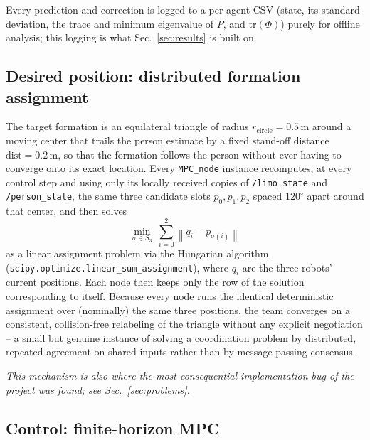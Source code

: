\documentclass[10pt,conference]{IEEEtran}
\begin{document}
Every prediction and correction is logged to a per-agent CSV (state, its standard deviation, the
trace and minimum eigenvalue of $P$, and $\mathrm{tr}(\Phi)$) purely for offline analysis; this
logging is what Sec.~\ref{sec:results} is built on.

\subsection{Desired position: distributed formation assignment}
\label{sec:desired-position}

The target formation is an equilateral triangle of radius $r_{\text{circle}}=0.5\,\mathrm{m}$
around a moving center that trails the person estimate by a fixed stand-off distance
$\text{dist}=0.2\,\mathrm{m}$, so that the formation follows the person without ever having to
converge onto its exact location. Every \texttt{MPC\_node} instance recomputes, at every control
step and using only its locally received copies of \texttt{/limo\_state} and
\texttt{/person\_state}, the same three candidate slots $p_0,p_1,p_2$ spaced $120^\circ$ apart
around that center, and then solves
\begin{equation}
\min_{\sigma\in S_3}\ \sum_{i=0}^{2} \left\| q_i - p_{\sigma(i)} \right\|
\end{equation}
as a linear assignment problem via the Hungarian algorithm \cite{kuhn1955}
(\texttt{scipy.optimize.linear\_sum\_assignment}), where $q_i$ are the three robots' current
positions. Each node then keeps only the row of the solution corresponding to itself. Because
every node runs the identical deterministic assignment over (nominally) the same three positions,
the team converges on a consistent, collision-free relabeling of the triangle without any
explicit negotiation -- a small but genuine instance of solving a coordination problem by
distributed, repeated agreement on shared inputs rather than by message-passing consensus.

\emph{This mechanism is also where the most consequential implementation bug of the project was
found; see Sec.~\ref{sec:problems}.}

\subsection{Control: finite-horizon MPC}
\label{sec:control}
\end{document}

